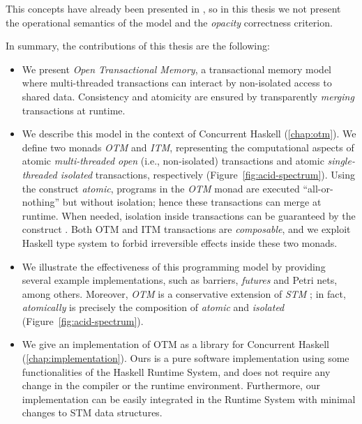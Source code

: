 This concepts have already been presented in \cite{MiculanPT15,Toneguzzo,OpenTransactionsSpec}, so in this thesis we not present the operational semantics of the model and the \emph{opacity} correctness criterion\cite{gk:ppopp08}.

In summary, the contributions of this thesis are the following:
\begin{itemize}
\item We present \emph{Open Transactional Memory}, a transactional memory model where multi-threaded transactions can interact by non-isolated access to shared data. Consistency and atomicity are ensured by transparently \emph{merging} transactions at runtime.

\item We describe this model in the context of Concurrent Haskell (\cref{chap:otm}).
We define two monads \emph{OTM} and \emph{ITM}, representing the computational aspects of atomic \emph{multi-threaded open} (i.e., non-isolated) transactions and atomic \emph{single-threaded isolated} transactions, respectively (Figure~\ref{fig:acid-spectrum}).
Using the construct \emph{atomic}, programs in the \emph{OTM} monad are executed ``all-or-nothing'' but without isolation; hence these transactions can merge at runtime.
When needed, isolation inside transactions can be guaranteed by the construct .
Both OTM and ITM transactions are \emph{composable},
and we exploit Haskell type system to forbid irreversible effects inside these two monads.

\item We illustrate the effectiveness of this programming model by providing several example implementations, such as barriers, \emph{futures} and Petri nets, among others.
Moreover, \emph{OTM} is a conservative extension 
of \emph{STM} \citep{Harris:2005:CMT:1065944.1065952}; in fact, \emph{atomically} is precisely the composition of \emph{atomic} and \emph{isolated} (Figure~\ref{fig:acid-spectrum}).

\item We give an implementation of OTM as a library for Concurrent Haskell (\cref{chap:implementation}).  Ours is a pure software implementation using some functionalities of the Haskell Runtime System, and does not require any change in the compiler or the runtime environment. Furthermore, our implementation can be easily integrated in the Runtime System with minimal changes to STM data structures.
\end{itemize}


